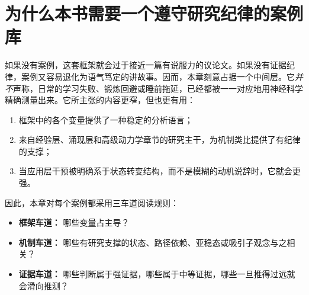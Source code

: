 \section{为什么本书需要一个遵守研究纪律的案例库}

如果没有案例，这套框架就会过于接近一篇有说服力的议论文。\nobreakspace 如果没有证据纪律，案例又容易退化为语气笃定的讲故事。因而，本章刻意占据一个中间层。它\emph{并不}声称，日常的学习失败、锻炼回避或睡前拖延，已经都被一一对应地用神经科学精确测量出来。它所主张的内容更窄，但也更有用：
\begin{enumerate}[nosep]
  \item 框架中的各个变量提供了一种稳定的分析语言；
  \item 来自经验层、涌现层和高级动力学章节的研究主干，为机制类比提供了有纪律的支撑；
  \item 当应用层干预被明确系于状态转变结构，而不是模糊的动机说辞时，它就会更强。
\end{enumerate}

因此，本章对每个案例都采用三车道阅读规则：
\begin{itemize}[nosep]
  \item \textbf{框架车道：} 哪些变量占主导？
  \item \textbf{机制车道：} 哪些有研究支撑的状态、路径依赖、亚稳态或吸引子观念与之相关？
  \item \textbf{证据车道：} 哪些判断属于强证据，哪些属于中等证据，哪些一旦推得过远就会滑向推测？
\end{itemize}